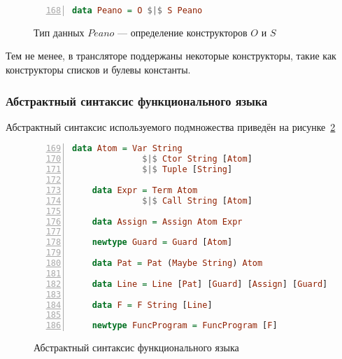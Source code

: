 \begin{figure}[h!]
  \begin{center}
  \begin{minipage}{0.4\textwidth}
  \begin{lstlisting}[language=Haskell, frame=single, numbers=left,numberstyle=\small, firstnumber=168, escapechar=|]
    data Peano = O $|$ S Peano
    \end{lstlisting}
  \end{minipage}
  \end{center}
  \caption{Тип данных $Peano$ --- определение конструкторов $O$ и $S$}
  \label{lst:peano}
\end{figure}

Тем не менее, в трансляторе поддержаны некоторые конструкторы, такие как конструкторы списков и булевы константы.


\subsubsection{Абстрактный синтаксис функционального языка}

Абстрактный синтаксис используемого подмножества \haskell{} приведён на рисунке~\ref{lst:funcast}

\begin{figure}[h!]
  \begin{center}
  \begin{minipage}{0.75\textwidth}
  \begin{lstlisting}[language=Haskell, frame=single, numbers=left,numberstyle=\small, firstnumber=169, escapechar=|]
    data Atom = Var String
              $|$ Ctor String [Atom]
              $|$ Tuple [String]
    
    data Expr = Term Atom
              $|$ Call String [Atom]
    
    data Assign = Assign Atom Expr
    
    newtype Guard = Guard [Atom]
    
    data Pat = Pat (Maybe String) Atom
    
    data Line = Line [Pat] [Guard] [Assign] [Guard] Expr
    
    data F = F String [Line]
    
    newtype FuncProgram = FuncProgram [F]
    \end{lstlisting}
  \end{minipage}
  \end{center}
  \caption{Абстрактный синтаксис функционального языка}
  \label{lst:funcast}
\end{figure}

